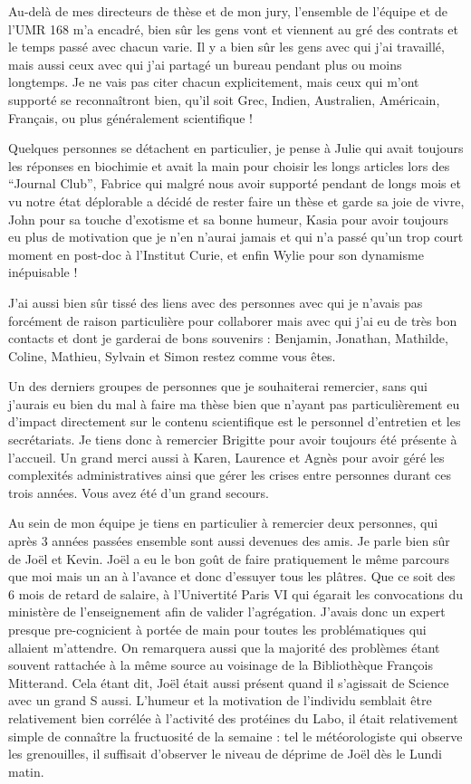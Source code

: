\documentclass[A4paperpaper,11pt,english]{sphinxmanual}
\begin{document}
Au-delà de mes directeurs de thèse et de mon jury, l'ensemble de l'équipe et de
l'UMR 168 m'a encadré, bien sûr les gens vont et viennent au gré des contrats et
le temps passé avec chacun varie. Il y a bien sûr les gens avec qui j'ai
travaillé, mais aussi ceux avec qui j'ai partagé un bureau pendant plus ou
moins longtemps. Je ne vais pas citer chacun explicitement, mais ceux qui m'ont
supporté se reconnaîtront bien, qu'il soit Grec, Indien, Australien,
Américain, Français, ou plus généralement scientifique !

Quelques personnes se détachent en particulier, je pense à Julie qui avait
toujours les réponses en biochimie et avait la main pour choisir les longs
articles lors des ``Journal Club'', Fabrice qui malgré nous avoir supporté
pendant de longs mois et vu notre état déplorable a décidé de rester faire un
thèse et garde sa joie de vivre, John pour sa touche d'exotisme et sa bonne
humeur, Kasia pour avoir toujours eu plus de motivation que je n'en n'aurai
jamais et qui n'a passé qu'un trop court moment en post-doc à l'Institut Curie,
et enfin Wylie pour son dynamisme inépuisable !

J'ai aussi bien sûr tissé des liens avec des personnes avec qui je n'avais pas
forcément de raison particulière pour collaborer mais avec qui j'ai eu de très
bon contacts et dont je garderai de bons souvenirs : Benjamin, Jonathan, Mathilde, Coline,
Mathieu, Sylvain et Simon restez comme vous êtes.

Un des derniers groupes de personnes que je souhaiterai remercier, sans qui
j'aurais eu bien du mal à faire ma thèse bien que n'ayant pas particulièrement
eu d'impact directement sur le contenu scientifique est le personnel
d'entretien et les secrétariats. Je tiens donc à remercier Brigitte pour avoir
toujours été présente à l'accueil. Un grand merci aussi à Karen, Laurence et
Agnès pour avoir géré les complexités administratives ainsi que gérer les crises
entre personnes durant ces trois années. Vous avez été d'un grand secours.

Au sein de mon équipe je tiens en particulier à remercier deux personnes, qui
après 3 années passées ensemble sont aussi devenues des amis. Je parle bien sûr de
Joël et Kevin. Joël a eu le bon goût de faire pratiquement le même parcours
que moi mais un an à l'avance et donc d'essuyer tous les plâtres. Que ce soit
des 6 mois de retard de salaire, à l'Univertité Paris VI qui égarait les
convocations du ministère de l'enseignement afin de valider l'agrégation.
J'avais donc un expert presque pre-cognicient à portée de main pour toutes les
problématiques qui allaient m'attendre. On remarquera aussi que la majorité des
problèmes étant souvent rattachée à la même source au voisinage de la
Bibliothèque François Mitterand. Cela étant dit, Joël était aussi présent quand
il s'agissait de Science avec un grand S aussi. L'humeur et la motivation de
l'individu semblait être relativement bien corrélée à l'activité des protéines du
Labo, il était relativement simple de connaître la fructuosité de la semaine :
tel le météorologiste qui observe les grenouilles, il suffisait d'observer le
niveau de déprime de Joël dès le Lundi matin.
\end{document}
